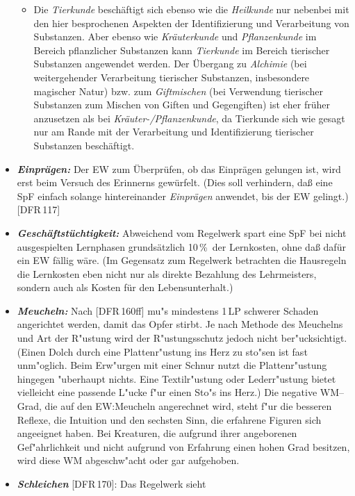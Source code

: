 \documentclass[10pt,a4paper,germanpar]{article}
\begin{document}
\begin{itemize}
\begin{itemize}
  \item Die \emph{Tierkunde} beschäftigt sich ebenso wie die \emph{Heilkunde}
    nur nebenbei mit den hier besprochenen Aspekten der Identifizierung und
    Verarbeitung von Substanzen. Aber ebenso wie \emph{Kräuterkunde} und
    \emph{Pflanzenkunde} im Bereich pflanzlicher Substanzen kann
    \emph{Tierkunde} im Bereich tierischer Substanzen angewendet werden. Der
    Übergang zu \emph{Alchimie} (bei weitergehender Verarbeitung tierischer
    Substanzen, insbesondere magischer Natur) bzw. zum \emph{Giftmischen} (bei
    Verwendung tierischer Substanzen zum Mischen von Giften und Gegengiften)
    ist eher früher anzusetzen als bei \emph{Kräuter-/Pflanzenkunde}, da
    Tierkunde sich wie gesagt nur am Rande mit der Verarbeitung und
    Identifizierung tierischer Substanzen beschäftigt.
  \end{itemize}
\item \emph{\textbf{Einprägen: }}Der EW zum Überprüfen, ob das Einprägen
  gelungen ist, wird erst beim Versuch des Erinnerns gewürfelt. (Dies soll
  verhindern, daß eine SpF einfach solange hintereinander \emph{Einprägen}
  anwendet, bis der EW gelingt.) [DFR\,117]
\item \emph{\textbf{Geschäftstüchtigkeit: }}Abweichend vom Regelwerk spart
  eine SpF bei nicht ausgespielten Lernphasen grundsätzlich 10\,\%\ der
  Lernkosten, ohne daß dafür ein EW fällig wäre. (Im Gegensatz zum Regelwerk
  betrachten die Hausregeln die Lernkosten eben nicht nur als direkte
  Bezahlung des Lehrmeisters, sondern auch als Kosten für den
  Lebensunterhalt.)
\item \textbf{\emph{Meucheln: }}Nach [DFR\,160ff] mu"s mindestens
  1\,LP schwerer Schaden angerichtet werden, damit das Opfer
  stirbt. Je nach Methode des Meuchelns und Art der R"ustung wird der
  R"ustungsschutz jedoch nicht ber"ucksichtigt. (Einen Dolch durch
  eine Plattenr"ustung ins Herz zu sto"sen ist fast unm"oglich. Beim
  Erw"urgen mit einer Schnur nutzt die Plattenr"ustung hingegen
  "uberhaupt nichts. Eine Textilr"ustung oder Lederr"ustung bietet
  vielleicht eine passende L"ucke f"ur einen Sto"s ins Herz.) Die
  negative WM--Grad, die auf den EW:Meucheln angerechnet wird, steht
  f"ur die besseren Reflexe, die Intuition und den sechsten Sinn, die
  erfahrene Figuren sich angeeignet haben. Bei Kreaturen, die aufgrund
  ihrer angeborenen Gef"ahrlichkeit und nicht aufgrund von Erfahrung
  einen hohen Grad besitzen, wird diese WM abgeschw"acht oder gar
  aufgehoben.
\item \emph{\textbf{Schleichen}} [DFR\,170]: Das Regelwerk sieht

\end{itemize}
\end{document}
